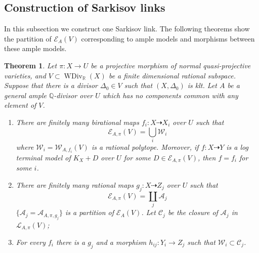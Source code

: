 \documentclass[11pt]{amsart}
\newtheorem{thm}[defn]{Theorem}
\begin{document}
\subsection{Construction of Sarkisov links}
In this subsection we construct one Sarkisov link. The following theorems show the partition of $\mathcal{E}_{A}(V)$  corresponding to ample models and morphisms between these ample models.
\begin{thm}\label{finitemodel}
\cite[Corollary 1.1.5]{BCHM10} Let $\pi:X\to U$ be a projective morphism of normal quasi-projective varieties,  and $V \subset \operatorname{WDiv}_{\mathbb{R}}(X)$ be a finite dimensional rational subspace. Suppose that there is a divisor $\Delta_{0} \in V$ such that $(X,\Delta_{0})$ is klt. Let $A$ be a general ample $\mathbb{Q}$-divisor over $U$ which has no components common with any element of $V$.  
  \begin{enumerate}
    \item   There are finitely many birational maps $f_{i}:X \dashrightarrow   X_{i}$ over $U$ such that 
      \[
        \mathcal{E}_{A,\pi}(V) =\bigcup_{i}\mathcal{W}_{i}
      \]
      where  $\mathcal{W}_{i}=\mathcal{W}_{A,f_{i}}(V)$ is a rational polytope. Moreover, if  $f:X \dashrightarrow  Y$ is a  log terminal model of $K_{X}+D$ over $U$ for some $D \in \mathcal{E}_{A,\pi}(V)$, then  $f=f_{i}$ for some $i$.  

    \item   There are finitely many rational maps $g_{j}:X \dashrightarrow  Z_{j}$ over $U$ such that
      \[
        \mathcal{E}_{A,\pi}(V) =\coprod_{j}\mathcal{A}_{j}
      \]
      $ \{\mathcal{A}_j=\mathcal{A}_{A,\pi,g_j}\} $ is a partition of $ \mathcal{E}_{A}(V) $. Let $\mathcal{C}_{j}$ be the closure of $\mathcal{A}_{j}$ in $\mathcal{L}_{A,\pi}(V)$;
    \item  For every  $f_{i}$ there is a $g_{j}$ and a morphism $h_{ij}:Y_{i}\to Z_{j}$ such that $\mathcal{W}_{i} \subset \mathcal{C}_{j}$.   
  \end{enumerate}
\end{thm}
\end{document}
